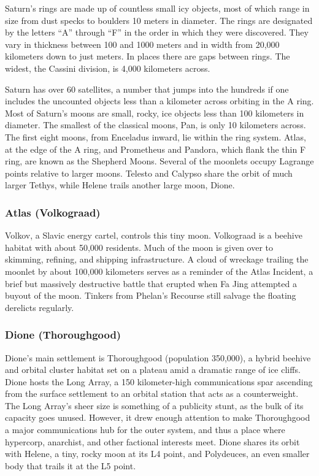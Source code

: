 Saturn's rings are made up of countless small icy objects, most of which range in size from dust specks to 
boulders 10 meters in diameter. The rings are designated by the letters ``A'' through ``F'' in the order in 
which they were discovered. They vary in thickness 
between 100 and 1000 meters and in width from 
20,000 kilometers down to just meters. In places there 
are gaps between rings. The widest, the Cassini division, is 4,000 kilometers across.

Saturn has over 60 satellites, a number 
that jumps into the hundreds if one includes the uncounted objects less than a 
kilometer across orbiting in the A ring. 
Most of Saturn's moons are small, rocky, 
ice objects less than 100 kilometers in 
diameter. The smallest of the classical 
moons, Pan, is only 10 kilometers across. 
The first eight moons, from Enceladus 
inward, lie within the ring system. Atlas, 
at the edge of the A ring, and Prometheus 
and Pandora, which flank the thin F 
ring, are known as the Shepherd Moons. 
Several of the moonlets occupy Lagrange 
points relative to larger moons. Telesto 
and Calypso share the orbit of much 
larger Tethys, while Helene trails another 
large moon, Dione.

\subsubsection{Atlas (Volkograad)}

Volkov, a Slavic energy cartel, controls this 
tiny moon. Volkograad is a beehive habitat 
with about 50,000 residents. Much of the 
moon is given over to skimming, refining, 
and shipping infrastructure. A cloud of 
wreckage trailing the moonlet by about 
100,000 kilometers serves as a reminder 
of the Atlas Incident, a brief but massively 
destructive battle that erupted when Fa 
Jing attempted a buyout of the moon. Tinkers from Phelan's Recourse still salvage 
the floating derelicts regularly.

\subsubsection{Dione (Thoroughgood)}

Dione's main settlement is Thoroughgood 
(population 350,000), a hybrid beehive 
and orbital cluster habitat set on a plateau 
amid a dramatic range of ice cliffs. Dione 
hosts the Long Array, a 150 kilometer-high communications spar ascending 
from the surface settlement to an orbital 
station that acts as a counterweight. The 
Long Array's sheer size is something of a 
publicity stunt, as the bulk of its capacity 
goes unused. However, it drew enough 
attention to make Thoroughgood a major 
communications hub for the outer system, 
and thus a place where hypercorp, anarchist, and other factional interests meet. 
Dione shares its orbit with Helene, a tiny, 
rocky moon at its L4 point, and Polydeuces, an even smaller body that trails it 
at the L5 point.


